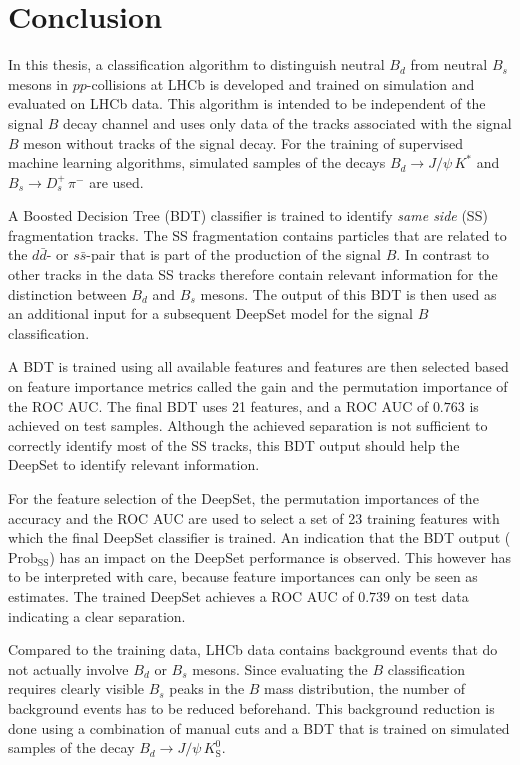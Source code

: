\chapter{Conclusion}

In this thesis, a classification algorithm to distinguish neutral $B_d$ from neutral $B_s$ mesons in $pp$-collisions at LHCb is developed and trained on simulation and evaluated on LHCb data.
This algorithm is intended to be independent of the signal $B$ decay channel and uses only data of the tracks associated with the signal $B$ meson without tracks of the signal decay.
For the training of supervised machine learning algorithms, simulated samples of the decays $B_d \rightarrow J/\psi \, K^*$ and $B_s \rightarrow D^+_s \, \pi^-$ are used.

A Boosted Decision Tree (BDT) classifier is trained to identify \emph{same side} (SS) fragmentation tracks.
The SS fragmentation contains particles that are related to the $d\bar{d}$- or $s\bar{s}$-pair that is part of the production of the signal $B$. 
In contrast to other tracks in the data SS tracks therefore contain relevant information for the distinction between $B_d$ and $B_s$ mesons.
The output of this BDT is then used as an additional input for a subsequent DeepSet model for the signal $B$ classification.

A BDT is trained using all available features and features are then selected based on feature importance metrics called the gain and the permutation importance of the ROC AUC. 
The final BDT uses 21 features, and a ROC AUC of $0.763$ is achieved on test samples.
Although the achieved separation is not sufficient to correctly identify most of the SS tracks, this BDT output should help the DeepSet to identify relevant information.

For the feature selection of the DeepSet, the permutation importances of the accuracy and the ROC AUC are used to select a set of 23 training features with which the final DeepSet classifier is trained.
An indication that the BDT output ($\text{Prob}_\text{SS}$) has an impact on the DeepSet performance is observed.
This however has to be interpreted with care, because feature importances can only be seen as estimates.
The trained DeepSet achieves a ROC AUC of $0.739$ on test data indicating a clear separation.

Compared to the training data, LHCb data contains background events that do not actually involve $B_d$ or $B_s$ mesons.
Since evaluating the $B$ classification requires clearly visible $B_s$ peaks in the $B$ mass distribution, the number of background events has to be reduced beforehand.
This background reduction is done using a combination of manual cuts and a BDT that is trained on simulated samples of the decay $B_d \rightarrow J/\psi \, K^0_\text{S}$.

